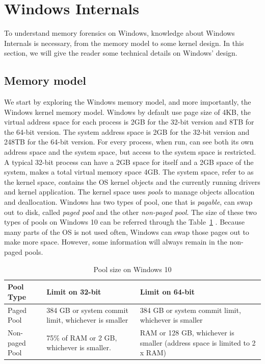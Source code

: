 \section[Windows Internals]{Windows Internals}

To understand memory forensics on Windows, knowledge about Windows Internals is necessary, from the memory model to some kernel design. In this section, we will give the reader some technical details on Windows' design.

\subsection[Memory model]{Memory model}

We start by exploring the Windows memory model, and more importantly, the Windows kernel memory model. Windows by default use page size of 4KB, the virtual address space for each process is 2GB for the 32-bit version and 8TB for the 64-bit version. The system address space is 2GB for the 32-bit version and 248TB for the 64-bit version. For every process, when run, can see both its own address space and the system space, but access to the system space is restricted. A typical 32-bit process can have a 2GB space for itself and a 2GB space of the system, makes a total virtual memory space 4GB. The system space, refer to as the kernel space, contains the OS kernel objects and the currently running drivers and kernel application. The kernel space uses \textit{pools} to manage objects allocation and deallocation. Windows has two types of pool, one that is \textit{pagable}, can swap out to disk, called \textit{paged pool} and the other \textit{non-paged pool}. The size of these two types of pools on Windows 10 can be referred through the Table~\ref{tab:poolsize} \cite{memorylimit}. Because many parts of the OS is not used often, Windows can swap those pages out to make more space. However, some information will always remain in the non-paged pools.

\begin{table}[h]
\centering
\caption{Pool size on Windows 10}
\label{tab:poolsize}
\begin{tabular}{l p{5cm} p{5cm} }
\toprule
\textbf{Pool Type} & \textbf{Limit on 32-bit} & \textbf{Limit on 64-bit} \\[5pt] \hline
\rule{0pt}{\normalbaselineskip}
Paged Pool & 384 GB or system commit limit, whichever is smaller & 384 GB or system commit limit, whichever is smaller \\[5pt]
Non-paged Pool & 75\% of RAM or 2 GB, whichever is smaller. & RAM or 128 GB, whichever is smaller (address space is limited to 2 x RAM) \\
\bottomrule
\end{tabular}
\end{table}

